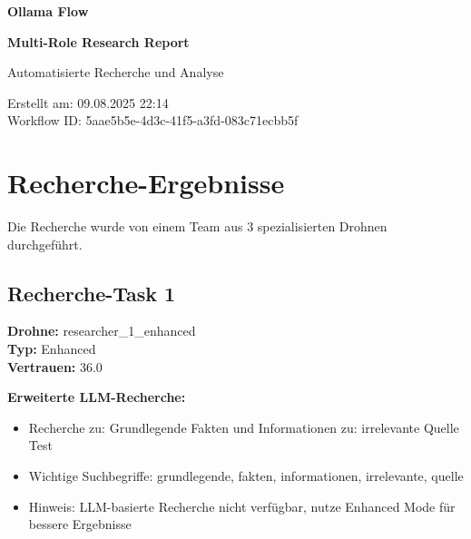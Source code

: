 \documentclass[12pt,a4paper]{article}
\begin{document}
\begin{titlepage}
    \centering
    
    \vspace*{2cm}
    
    {\Huge\bfseries Ollama Flow}
    
    {\Huge\bfseries Multi-Role Research Report}
    
    \vspace{2cm}
    
    {\Large Automatisierte Recherche und Analyse}
    
    \vspace{3cm}
    
    
    \vspace{2cm}
    
    
    \vfill
    
    {\large
    Erstellt am: 09.08.2025 22:14\\
    Workflow ID: 5aae5b5e-4d3c-41f5-a3fd-083c71ecbb5f
    }
    
\end{titlepage}

\newpage
\tableofcontents
\newpage

\section{Recherche-Ergebnisse}

Die Recherche wurde von einem Team aus 3 spezialisierten Drohnen durchgeführt.

\subsection{Recherche-Task 1}

\textbf{Drohne:} researcher\_1\_enhanced\\
\textbf{Typ:} Enhanced\\
\textbf{Vertrauen:} 36.0%

\textbf{Erweiterte LLM-Recherche:}
\begin{itemize}
\item Recherche zu: Grundlegende Fakten und Informationen zu: irrelevante Quelle Test
\item Wichtige Suchbegriffe: grundlegende, fakten, informationen, irrelevante, quelle
\item Hinweis: LLM-basierte Recherche nicht verfügbar, nutze Enhanced Mode für bessere Ergebnisse
\end{itemize}
\end{document}

